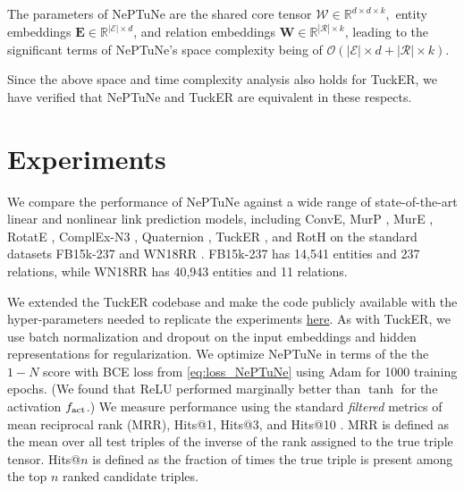 \documentclass[11pt]{article}
\begin{document}
The parameters of NePTuNe are the shared core tensor $\mathcal{W} \in \mathbb{R}^{d \times d \times k},$ entity embeddings $\mathbf{E} \in \mathbb{R}^{\mathcal{|E|} \times d}$, and relation embeddings $\mathbf{W} \in \mathbb{R}^{\mathcal{|R|} \times k}$, leading to the significant terms of NePTuNe's space complexity being of $\mathcal{O}(|\mathcal{E}| \times d + |\mathcal{R}| \times k)$. 

Since the above space and time complexity analysis also holds for TuckER, we have verified that NePTuNe and TuckER are equivalent in these respects.


\section{Experiments}

We compare the performance of NePTuNe against a wide range of state-of-the-art linear and nonlinear link prediction models, including ConvE\cite{dettmers2018convolutional}, MurP \cite{balazevic2019multi}, 
MurE \cite{balazevic2019multi}, 
RotatE \cite{sun2019rotate}, 
ComplEx-N3 \cite{lacroix2018canonical}, 
Quaternion \cite{NEURIPS2019_d961e9f2},
TuckER \cite{balavzevic2019tucker}, 
and RotH \cite{chami2020low} on the standard datasets 
FB15k-237 \cite{toutanova2015representing} and WN18RR \cite{dettmers2018convolutional}. 
FB15k-237 has 14,541 entities and 237 relations, while WN18RR has 40,943 entities and 11 relations.



We extended the TuckER codebase \cite{tucker_code} and make the code publicly available with the hyper-parameters needed to replicate the experiments \textcolor{blue}{\href{https://github.com/luffycodes/neptune}{here}}.
As with TuckER, we use batch normalization \cite{ioffe2015batch} and dropout \cite{srivastava2014dropout} on the input embeddings and hidden representations for regularization. 
We optimize NePTuNe in terms of the  the $1-N$ score with BCE loss from \eqref{eq:loss_NePTuNe}
using Adam \cite{kingman2015adam} for 1000 training epochs. 
(We found that ReLU performed marginally better than $\tanh$ for the activation $f_{\rm act}$.)
We measure performance using the standard \textit{filtered} metrics of mean reciprocal rank (MRR), Hits@1, Hits@3, and Hits@10 \cite{bordes2013translating}. MRR is defined as the mean over all test triples of the inverse of the rank assigned to the true triple tensor. Hits@$n$ is defined as the fraction of times the true triple is present among the top $n$ ranked candidate triples.
\end{document}
